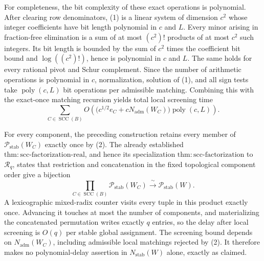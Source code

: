 For completeness, the bit complexity of these exact operations is polynomial.  After clearing row denominators, (1) is a linear system of dimension \(c^2\) whose integer coefficients have bit length polynomial in \(c\) and \(L\).  Every minor arising in fraction-free elimination is a sum of at most \((c^2)!\) products of at most \(c^2\) such integers.  Its bit length is bounded by the sum of \(c^2\) times the coefficient bit bound and \(\log((c^2)!)\), hence is polynomial in \(c\) and \(L\).  The same holds for every rational pivot and Schur complement.  Since the number of arithmetic operations is polynomial in \(c\), normalization, solution of (1), and all sign tests take \(\operatorname{poly}(c,L)\) bit operations per admissible matching.  Combining this with the exact-once matching recursion yields total local screening time
\[
 \sum_{C\in\operatorname{SCC}(B)}
 O\!\left(\bigl(c^{1/2}e_C+cN_{\mathrm{adm}}(W_C)\bigr)
          \operatorname{poly}(c,L)\right).
\]

For every component, the preceding construction retains every member of \(\mathcal P_{\mathrm{stab}}(W_C)\) exactly once by (2).  The already established \(\mathrm{thm:scc\mbox{-}factorization\mbox{-}real}\), and hence its specialization \(\mathrm{thm:scc\mbox{-}factorization}\) to \(\mathcal R_q\), states that restriction and concatenation in the fixed topological component order give a bijection
\[
 \prod_{C\in\operatorname{SCC}(B)}\mathcal P_{\mathrm{stab}}(W_C)
 \xrightarrow{\ \sim\ }
 \mathcal P_{\mathrm{stab}}(W).
\]
A lexicographic mixed-radix counter visits every tuple in this product exactly once.  Advancing it touches at most the number of components, and materializing the concatenated permutation writes exactly \(q\) entries, so the delay after local screening is \(O(q)\) per stable global assignment.  The screening bound depends on \(N_{\mathrm{adm}}(W_C)\), including admissible local matchings rejected by (2).  It therefore makes no polynomial-delay assertion in \(N_{\mathrm{stab}}(W)\) alone, exactly as claimed.
